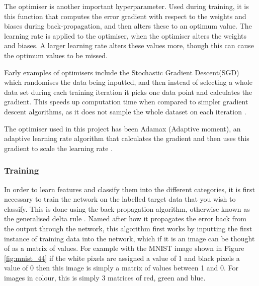 \documentclass[12pt, onecolumn]{aa}
\begin{document}
The optimiser is another important hyperparameter. Used during training, it is this function that computes the error gradient with respect to the weights and biases during back-propagation, and then alters these to an optimum value. The learning rate is applied to the optimiser, when the optimiser alters the weights and biases. A larger learning rate alters these values more, though this can cause the optimum values to be missed.

Early examples of optimisers include the Stochastic Gradient Descent(SGD) which randomises the data being inputted, and then instead of selecting a whole data set during each training iteration it picks one data point and calculates the gradient. This speeds up computation time when compared to simpler gradient descent algorithms, as it does not sample the whole dataset on each iteration \citep{Bottou10large-scalemachine}.

The optimiser used in this project has been Adamax (Adaptive moment), an adaptive learning rate algorithm that calculates the gradient and then uses this gradient to scale the learning rate \citep{adam}.

\subsubsection{Training}\label{sec:trainingdeep}
In order to learn features and classify them into the different categories, it is first necessary to train the network on the labelled target data that you wish to classify. This is done using the back-propagation algorithm, otherwise known as the generalised delta rule \citep{KhanSalman2018AGtC}. Named after how it propagates the error back from the output through the network, this algorithm first works by inputting the first instance of training data into the network, which if it is an image can be thought of as a matrix of values. For example with the MNIST image shown in Figure \ref{fig:mnist_44} if the white pixels are assigned a value of 1 and black pixels a value of 0 then this image is simply a matrix of values between 1 and 0. For images in colour, this is simply 3 matrices of red, green and blue. 
\end{document}
